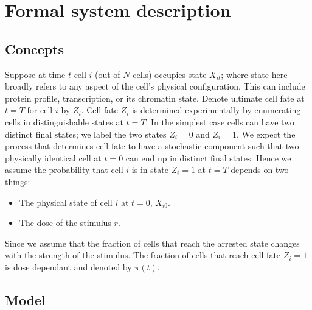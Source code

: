 
\section{Formal system description}
\label{sec:model-descr}

\subsection{Concepts}
\label{sec:concepts}


Suppose at time $t$ cell $i$ (out of $N$ cells) occupies state $X_{it}$; where state here broadly refers to any aspect of the cell's physical configuration. This can include protein profile, transcription, or its chromatin state. Denote ultimate cell fate at $t=T$ for cell $i$ by $Z_i$. Cell fate $Z_i$ is determined experimentally by enumerating cells in distinguishable states at $t=T$. In the simplest case cells can have two distinct final states; we label the two states $Z_i = 0$ and $Z_i = 1$. We expect the process that determines cell fate to have a stochastic component such that two physically identical cell at $t=0$ can end up in distinct final states. Hence we assume the probability that cell $i$ is in state $Z_i = 1$ at $t=T$ depends on two things:

\begin{itemize}
\item The physical state of cell $i$ at $t=0$, $X_{i0}$.
\item The dose of the stimulus $r$. 
\end{itemize}

Since we assume that the fraction of cells that reach the arrested state changes with the strength of the stimulus. The fraction of cells that reach cell fate $Z_i = 1$ is dose dependant and denoted by $\pi(t)$.

\subsection{Model}
\label{sec:model-cell}




